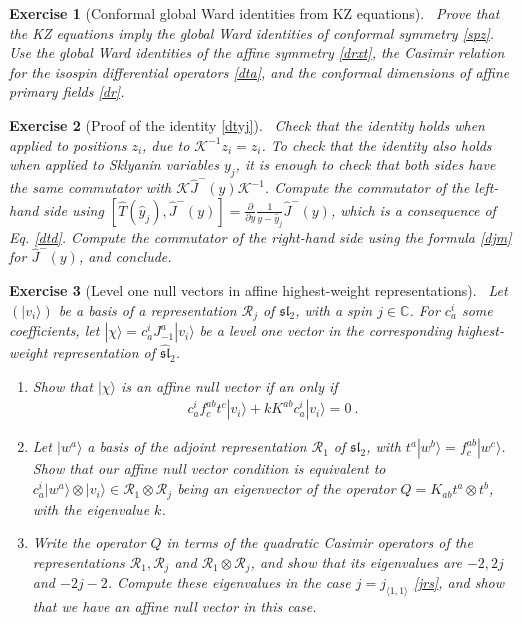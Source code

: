 \documentclass[12pt, a4paper, notitlepage, twoside]{report}
\numberwithin{equation}{section}
\theoremstyle{break}
\newtheorem{exo}{Exercise}[chapter]
\begin{document}
\begin{exo}[Conformal global Ward identities from KZ equations]
 ~\label{exokz}
 Prove that the KZ equations imply the global Ward identities of conformal symmetry \eqref{spz}.
 Use the global Ward identities of the affine symmetry \eqref{drxt}, the Casimir relation for the isospin differential operators \eqref{dta}, and the conformal dimensions of affine primary fields \eqref{dr}. 
\end{exo}


\begin{exo}[Proof of the identity \eqref{dtyj}]
 ~\label{exoktk}
Check that the identity holds when applied to positions $z_i$, due to $\mathcal{K}^{-1}z_i = z_i$. 
To check that the identity also holds when applied to Sklyanin variables $y_j$, it is enough to check 
that both sides have the same commutator with $\mathcal{K}\hat{J}^-(y)\mathcal{K}^{-1}$. 
Compute the commutator of the left-hand side using $[\hat{T}(\hat{y}_j),\hat{J}^-(y)]={\frac{\partial}{\partial y}}\frac{1}{y-\hat{y}_j}\hat{J}^-(y)$, which is a consequence of Eq. \eqref{dtd}.
Compute the commutator of the 
right-hand side using the formula \eqref{djm} for $\hat{J}^-(y)$, and conclude.
\end{exo}

\begin{exo}[Level one null vectors in affine highest-weight representations]
 ~\label{exolos}
 Let $(|v_i\rangle)$ be a basis of a representation $\mathcal{R}_j$ of $\mathfrak{sl}_2$, with a spin $j\in\mathbb{C}$. For $c_a^i$ some coefficients, let $|\chi\rangle =  c_a^i J_{-1}^a|v_i\rangle$ be a level one vector in the corresponding highest-weight representation of $\widehat{\mathfrak{sl}}_2$.
 \begin{enumerate}
  \item Show that $|\chi \rangle $ is an affine null vector if an only if 
  \begin{align}
    c_a^i f^{ab}_c t^c|v_i\rangle + k K^{ab} c_a^i |v_i\rangle = 0\ .
  \end{align}
  \item Let $|w^a\rangle$ a basis of the adjoint representation $\mathcal{R}_1$ of $\mathfrak{sl}_2$, with $t^a|w^b\rangle = f^{ab}_c|w^c\rangle$. Show that our affine null vector condition is equivalent to $c_a^i|w^a\rangle\otimes |v_i\rangle\in \mathcal{R}_1\otimes \mathcal{R}_j$ being an eigenvector of the operator $Q=K_{ab}t^a\otimes t^b$, with the eigenvalue $k$.
  \item Write the operator $Q$ in terms of the quadratic Casimir operators of the representations $\mathcal{R}_1, \mathcal{R}_j$ and $\mathcal{R}_1\otimes \mathcal{R}_j$, and show that its eigenvalues are $-2, 2j$ and $-2j-2$. 
  Compute these eigenvalues in the case $j=j_{\langle 1,1\rangle}$ \eqref{jrs}, and show that we have an affine null vector in this case. 
 \end{enumerate}
\end{exo}
\end{document}
